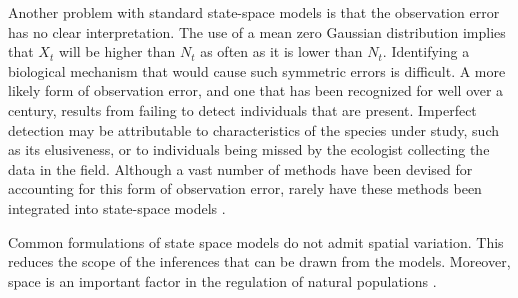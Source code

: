 \documentclass[12pt]{article}
\begin{document}
Another problem with standard state-space models is that the
observation error has no clear interpretation. The use of a mean zero
Gaussian distribution implies that $X_t$ will be
higher than $N_t$ as often as it is lower than $N_t$. 
Identifying a biological mechanism that would cause such symmetric errors
is difficult.
A more likely form of observation error, and one that has been recognized for well
over a century, results from failing to detect individuals that are
present. Imperfect detection may be attributable to
characteristics of the species under study, such as its elusiveness,
or to individuals being missed by the ecologist collecting the data in the field.
Although a vast number of methods have been devised for accounting for
this form of observation error, rarely have these methods been
integrated into state-space models \citep[but
see][]{buckland_etal:2004}.

Common formulations of state space models do not admit
spatial variation. This reduces the scope of the inferences that can
be drawn from the models. Moreover, space is an important factor in the
regulation of natural populations \citep{murdoch:1994,
pulliam:1988, gill_etal:2001}.
\end{document}
